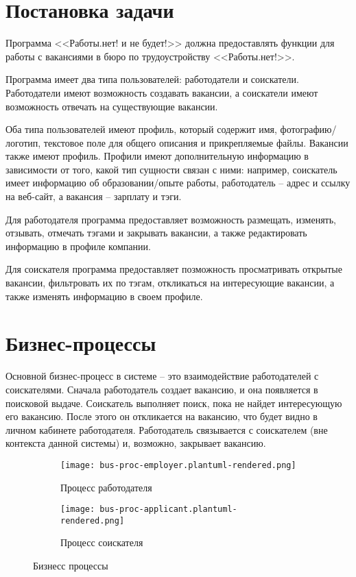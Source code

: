 \documentclass[a4page]{article}
\begin{document}
\newpage
\section{Постановка задачи}

Программа <<Работы.нет! и не будет!>> должна предоставлять функции для работы с вакансиями в бюро по трудоустройству <<Работы.нет!>>.

Программа имеет два типа пользователей: работодатели и соискатели. Работодатели имеют возможность создавать вакансии,
а соискатели имеют возможность отвечать на существующие вакансии.

Оба типа пользователей имеют профиль, который содержит имя, фотографию/логотип, текстовое поле для общего описания и прикрепляемые файлы.
Вакансии также имеют профиль. Профили имеют дополнительную информацию в зависимости от того, какой тип сущности связан с ними:
например, соискатель имеет информацию об образовании/опыте работы, работодатель -- адрес и ссылку на веб-сайт,
а вакансия -- зарплату и тэги.

Для работодателя программа предоставляет возможность размещать, изменять, отзывать, отмечать тэгами и закрывать вакансии, а также редактировать информацию в профиле компании.

Для соискателя программа предоставляет позможность просматривать открытые вакансии, фильтровать их по тэгам, откликаться на интересующие вакансии, а также изменять информацию в своем профиле.

\newpage
\section{Бизнес-процессы}

Основной бизнес-процесс в системе -- это взаимодействие работодателей с соискателями.
Сначала работодатель создает вакансию, и она появляется в поисковой выдаче.
Соискатель выполняет поиск, пока не найдет интересующую его вакансию.
После этого он откликается на вакансию,
что будет видно в личном кабинете работодателя.
Работодатель связывается с соискателем (вне контекста данной системы)
и, возможно, закрывает вакансию.

\begin{figure}[H]
  \centering
  \begin{subfigure}{0.45\textwidth}
    \centering
    \texttt{[image: bus-proc-employer.plantuml-rendered.png]}
    \caption{Процесс работодателя}
  \end{subfigure}
  \begin{subfigure}{0.45\textwidth}
    \centering
    \texttt{[image: bus-proc-applicant.plantuml-rendered.png]}
    \caption{Процесс соискателя}
  \end{subfigure}
  \caption{Бизнесс процессы}
\end{figure}
\end{document}
